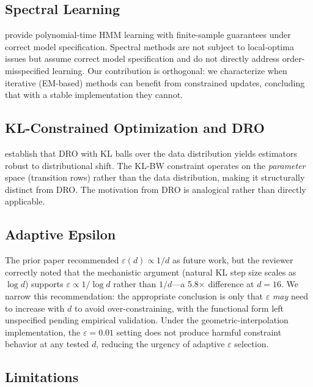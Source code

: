 \documentclass[11pt,letterpaper]{article}
\begin{document}
\subsection{Spectral Learning}

\citet{Hsu2012} provide polynomial-time HMM learning with finite-sample guarantees under correct model specification.
Spectral methods are not subject to local-optima issues but assume correct model specification and do not directly address
order-misspecified learning. Our contribution is orthogonal: we characterize when iterative (EM-based) methods can benefit
from constrained updates, concluding that with a stable implementation they cannot.

\subsection{KL-Constrained Optimization and DRO}

\citet{Duchi2021} establish that DRO with KL balls over the data distribution yields estimators robust to distributional
shift. The KL-BW constraint operates on the \emph{parameter} space (transition rows) rather than the data distribution,
making it structurally distinct from DRO. The motivation from DRO is analogical rather than directly applicable.

\subsection{Adaptive Epsilon}

The prior paper recommended $\varepsilon(d) \propto 1/d$ as future work, but the reviewer correctly noted that the
mechanistic argument (natural KL step size scales as $\log d$) supports $\varepsilon \propto 1/\log d$ rather than
$1/d$---a 5.8$\times$ difference at $d=16$. We narrow this recommendation: the appropriate conclusion is only that
$\varepsilon$ \emph{may} need to increase with $d$ to avoid over-constraining, with the functional form left unspecified
pending empirical validation. Under the geometric-interpolation implementation, the $\varepsilon=0.01$ setting does not
produce harmful constraint behavior at any tested $d$, reducing the urgency of adaptive $\varepsilon$ selection.

\subsection{Limitations}
\end{document}
